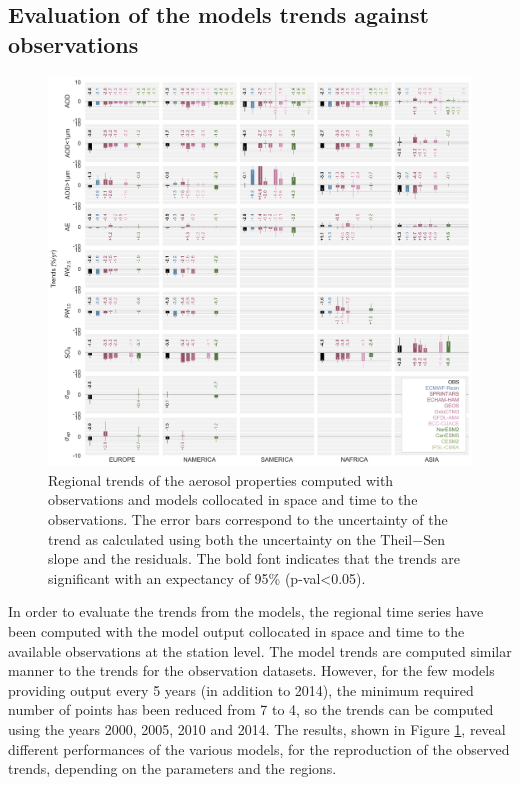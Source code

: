 \documentclass[journal abbreviation, manuscript]{copernicus}
\begin{document}
\subsection{Evaluation of the models trends against observations}\label{mod_evaluation}

\begin{figure}[t]
 \includegraphics[width=16cm]{../scripts/figs/heatmaps/BARS.png}
 \caption{Regional trends of the aerosol properties computed with observations and models collocated in space and time to the observations. The error bars correspond to the uncertainty of the trend as calculated using both the uncertainty on the Theil−Sen slope and the residuals. The bold font indicates that the trends are significant with an expectancy of 95\% (p-val<0.05).}
 \label{fig:bars}
\end{figure}

In order to evaluate the trends from the models, the regional time series have been computed with the model output collocated in space and time to the available observations at the station level. The model trends are computed similar manner to the trends for the observation datasets. However, for the few models providing output every 5 years (in addition to 2014), the minimum required number of points has been reduced from 7 to 4, so the trends can be computed using the years 2000, 2005, 2010 and 2014. The results, shown in Figure \ref{fig:bars}, reveal different performances of the various models, for the reproduction of the observed trends, depending on the parameters and the regions.
\end{document}
